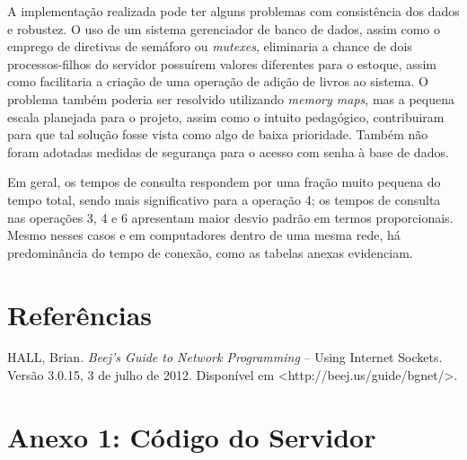\documentclass[11pt, brazil]{article} %
\begin{document}
A implementação realizada pode ter alguns problemas com consistência dos dados e robustez. 
O uso de um sistema gerenciador de banco de dados, assim como o emprego de diretivas de semáforo ou \emph{mutexes}, eliminaria a chance de dois processos-filhos do servidor possuírem valores diferentes para o estoque, assim como facilitaria a criação de uma operação de adição de livros ao sistema. 
O problema também poderia ser resolvido utilizando \emph{memory maps}, mas a pequena escala planejada para o projeto, assim como o intuito pedagógico, contribuiram para que tal solução fosse vista como algo de baixa prioridade. 
Também não foram adotadas medidas de segurança para o acesso com senha à base de dados.

Em geral, os tempos de consulta respondem por uma fração muito pequena do tempo total, sendo mais significativo para a operação 4; os tempos de consulta nas operações 3, 4 e 6 apresentam maior desvio padrão em termos proporcionais. 
Mesmo nesses casos e em computadores dentro de uma mesma rede, há predominância do tempo de conexão, como as tabelas anexas evidenciam.

\section{Referências}

HALL, Brian. \emph{Beej's Guide to Network Programming} -- Using Internet Sockets. Versão 3.0.15, 3 de julho de 2012. Disponível em <http://beej.us/guide/bgnet/>.

\section*{Anexo 1: Código do Servidor}
\end{document}
